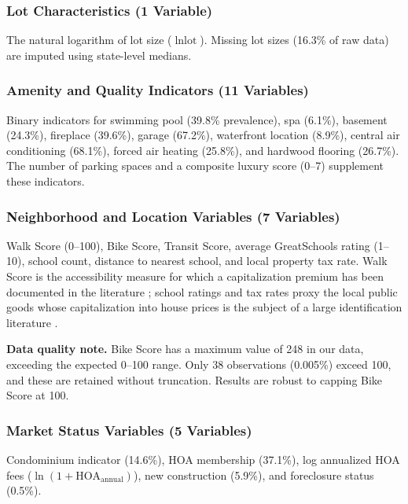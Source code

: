 \subsubsection{Lot Characteristics (1 Variable)}

The natural logarithm of lot size ($\ln\text{lot}$). Missing lot sizes (16.3\% of raw data) are imputed using state-level medians.

\subsubsection{Amenity and Quality Indicators (11 Variables)}

Binary indicators for swimming pool (39.8\% prevalence), spa (6.1\%), basement (24.3\%), fireplace (39.6\%), garage (67.2\%), waterfront location (8.9\%), central air conditioning (68.1\%), forced air heating (25.8\%), and hardwood flooring (26.7\%). The number of parking spaces and a composite luxury score (0--7) supplement these indicators.

\subsubsection{Neighborhood and Location Variables (7 Variables)}

Walk Score (0--100), Bike Score, Transit Score, average GreatSchools rating (1--10), school count, distance to nearest school, and local property tax rate. Walk Score is the accessibility measure for which a capitalization premium has been documented in the literature \citep{pivo2011walkability}; school ratings and tax rates proxy the local public goods whose capitalization into house prices is the subject of a large identification literature \citep{oates1969effects, black1999better, bayer2007unified}.

\textbf{Data quality note.} Bike Score has a maximum value of 248 in our data, exceeding the expected 0--100 range. Only 38 observations (0.005\%) exceed 100, and these are retained without truncation. Results are robust to capping Bike Score at 100.

\subsubsection{Market Status Variables (5 Variables)}

Condominium indicator (14.6\%), HOA membership (37.1\%), log annualized HOA fees ($\ln(1 + \text{HOA}_\text{annual})$), new construction (5.9\%), and foreclosure status (0.5\%).

